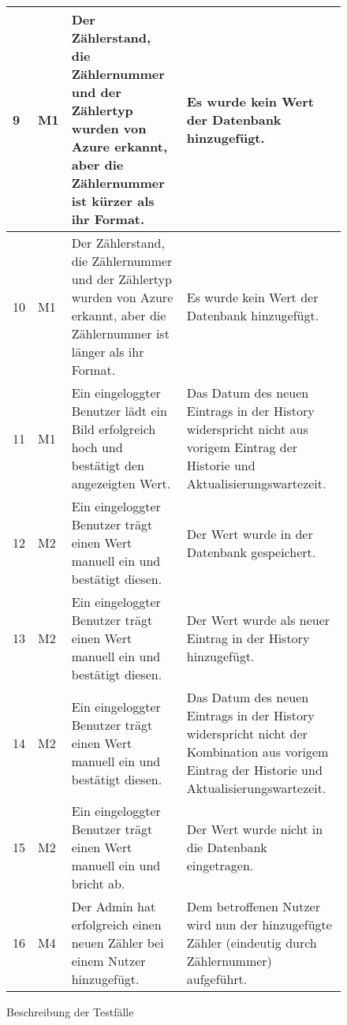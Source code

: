 	\begin{figure}[!h]
		\begin{center}
			\begin{tabularx}{\textwidth}{ p{} | p{} | p{} | X }
				\hline
				9 & M1 & Der Zählerstand, die Zählernummer und der Zählertyp wurden von Azure erkannt, aber die Zählernummer ist kürzer als ihr Format.  & Es wurde kein Wert der Datenbank hinzugefügt. \\ \hline
				10 & M1 & Der Zählerstand, die Zählernummer und der Zählertyp wurden von Azure erkannt, aber die Zählernummer ist länger als ihr Format.  & Es wurde kein Wert der Datenbank hinzugefügt. \\ \hline
				11 & M1 & Ein eingeloggter Benutzer lädt ein Bild erfolgreich hoch und bestätigt den angezeigten Wert.  & Das Datum des neuen Eintrags in der History widerspricht nicht aus vorigem Eintrag der Historie und Aktualisierungswartezeit. \\ \hline
				12 & M2 & Ein eingeloggter Benutzer trägt einen Wert manuell ein und bestätigt diesen. & Der Wert wurde in der Datenbank gespeichert. \\ \hline
				13 & M2 & Ein eingeloggter Benutzer trägt einen Wert manuell ein und bestätigt diesen. & Der Wert wurde als neuer Eintrag in der History hinzugefügt. \\ \hline
				14 & M2 & Ein eingeloggter Benutzer trägt einen Wert manuell ein und bestätigt diesen. & Das Datum des neuen Eintrags in der History widerspricht nicht der Kombination aus vorigem Eintrag der Historie und Aktualisierungswartezeit. \\ \hline
				15 & M2 & Ein eingeloggter Benutzer trägt einen Wert  manuell ein und bricht ab. & Der Wert wurde nicht in die Datenbank eingetragen. \\ \hline
				16 & M4 & Der Admin hat erfolgreich einen neuen Zähler bei einem Nutzer hinzugefügt.   & Dem betroffenen Nutzer wird nun der hinzugefügte Zähler (eindeutig durch Zählernummer) aufgeführt. \\ \hline
			\end{tabularx}	
		\end{center}
		\caption{Beschreibung der Testfälle}
		\label{fig:testfaelle-tabelle}
	\end{figure}
	